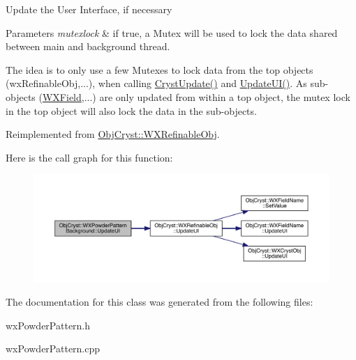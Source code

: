Update the User Interface, if necessary


\begin{DoxyParams}{Parameters}
{\em mutexlock} & if true, a Mutex will be used to lock the data shared between main and background thread.\\
\hline
\end{DoxyParams}
The idea is to only use a few Mutexes to lock data from the top objects (wx\+Refinable\+Obj,...), when calling \mbox{\hyperlink{class_obj_cryst_1_1_w_x_powder_pattern_background_a88a6987f3747b2538572e91f04b8f08d}{Cryst\+Update()}} and \mbox{\hyperlink{class_obj_cryst_1_1_w_x_powder_pattern_background_a7e54d0ef518f44f897d7363e7f96e4ae}{Update\+U\+I()}}. As sub-\/objects (\mbox{\hyperlink{class_obj_cryst_1_1_w_x_field}{W\+X\+Field}},...) are only updated from within a top object, the mutex lock in the top object will also lock the data in the sub-\/objects. 

Reimplemented from \mbox{\hyperlink{class_obj_cryst_1_1_w_x_refinable_obj_acbf70975a79661a73a1ae3c39c9c3045}{Obj\+Cryst\+::\+W\+X\+Refinable\+Obj}}.

Here is the call graph for this function\+:
\nopagebreak
\begin{figure}[H]
\begin{center}
\leavevmode
\includegraphics[width=350pt]{class_obj_cryst_1_1_w_x_powder_pattern_background_a7e54d0ef518f44f897d7363e7f96e4ae_cgraph}
\end{center}
\end{figure}


The documentation for this class was generated from the following files\+:\begin{DoxyCompactItemize}
\item 
wx\+Powder\+Pattern.\+h\item 
wx\+Powder\+Pattern.\+cpp\end{DoxyCompactItemize}
